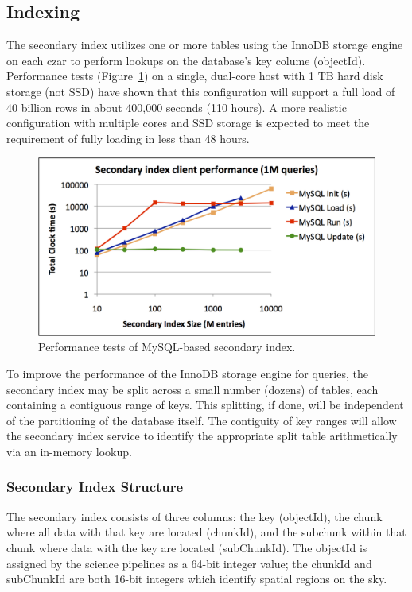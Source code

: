 \documentclass[DM,lsstdraft,toc]{lsstdoc}
\begin{document}
\subsection{Indexing}\label{indexing-1}

The secondary index utilizes one or more tables using the InnoDB storage
engine on each czar to perform lookups on the database's key colume
(objectId). Performance tests (Figure~\ref{fig:indexing-tests}) on a
single, dual-core host with 1 TB hard disk storage (not SSD) have shown
that this configuration will support a full load of 40 billion rows in
about 400,000 seconds (110 hours). A more realistic configuration with
multiple cores and SSD storage is expected to meet the requirement of
fully loading in less than 48 hours.

\begin{figure}[H]
\centering
\includegraphics[width=\textwidth]{_static/indexing_tests.png}
\caption{Performance tests of MySQL-based secondary index. \label{fig:indexing-tests}}
\end{figure}

To improve the performance of the InnoDB storage engine for queries, the
secondary index may be split across a small number (dozens) of tables,
each containing a contiguous range of keys. This splitting, if done,
will be independent of the partitioning of the database itself. The
contiguity of key ranges will allow the secondary index service to
identify the appropriate split table arithmetically via an in-memory
lookup.

\subsubsection{Secondary Index
Structure}\label{secondary-index-structure}

The secondary index consists of three columns: the key (objectId), the
chunk where all data with that key are located (chunkId), and the
subchunk within that chunk where data with the key are located
(subChunkId). The objectId is assigned by the science pipelines as a
64-bit integer value; the chunkId and subChunkId are both 16-bit
integers which identify spatial regions on the sky.
\end{document}
